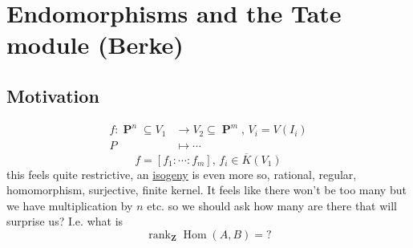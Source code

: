 \documentclass[10pt,]{book}
\numberwithin{equation}{section}
\newcommand{\lb}{[}
\newcommand{\rb}{]}
\newcommand{\ZZ}{\mathbf{Z}}
\DeclareMathOperator{\Hom}{Hom}
\DeclareMathOperator{\rank}{rank}
\DeclareMathOperator{\PP}{\mathbf{P}}
\newcommand{\amp}{&}
\begin{document}
\section[{Endomorphisms and the Tate module (Berke)}]{Endomorphisms and the Tate module (Berke)}\label{sec-endomorphisms}
\subsection*{Motivation}
\hypertarget{p-207}{}%
%
\begin{align*}
f \colon \PP^n\subseteq V_1 \amp\to V_2 \subseteq \PP^m,\,V_i = V(I_i)\\
P\amp \mapsto \cdots
\end{align*}
%
\begin{equation*}
f = \lb f_1 : \cdots : f_m\rb ,\,f_i\in \overline K (V_1)
\end{equation*}
this feels quite restrictive, an \hyperref[def-supersing-isog-isog]{isogeny} is even more so, rational, regular, homomorphism, surjective, finite kernel. It feels like there won't be too many but we have multiplication by \(n\) etc. so we should ask how many are there that will surprise us? I.e. what is%
\begin{equation*}
\rank_\ZZ \Hom(A,B) = ?
\end{equation*}
\label{notation-1}
%
%
%
\typeout{************************************************}
\typeout{************************************************}
%
\end{document}
